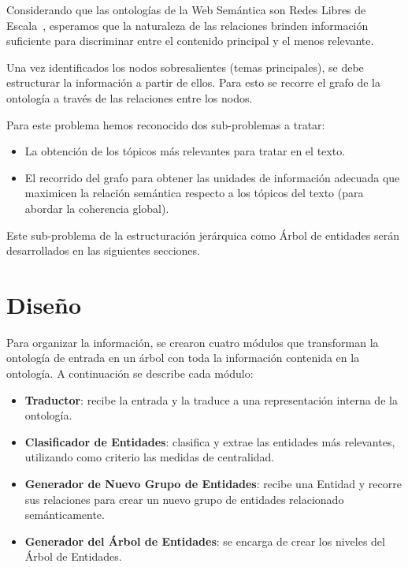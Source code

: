 Considerando que las ontologías de la Web Semántica son Redes Libres de Escala~\cite{zhang2008scale}, esperamos que la naturaleza de las relaciones brinden información suficiente para discriminar entre el contenido principal y el menos relevante. 

Una vez identificados los nodos sobresalientes (temas principales), se debe estructurar la información a partir de ellos. Para esto se recorre el grafo de la ontología a través de las relaciones entre los nodos.

Para este problema hemos reconocido dos sub-problemas a tratar:

\begin{itemize}
    \item La obtención de los tópicos más relevantes para tratar en el texto.%
    \item El recorrido del grafo para obtener las unidades de información adecuada que maximicen la relación semántica respecto a los tópicos del texto (para abordar la coherencia global).%
\end{itemize}

Este sub-problema de la estructuración jerárquica como Árbol de entidades serán desarrollados en las siguientes secciones.  %


\section{Diseño}
Para organizar la información, se crearon cuatro módulos que transforman la ontología de entrada en un árbol con toda la información contenida en la ontología. A continuación se describe cada módulo:
\begin{itemize}
    \item \textbf{Traductor}: recibe la entrada y la traduce a una representación interna de la ontología.
    \item \textbf{Clasificador de Entidades}: clasifica y extrae las entidades más relevantes, utilizando como criterio las medidas de centralidad.
    \item \textbf{Generador de Nuevo Grupo de Entidades}: recibe una Entidad y recorre sus relaciones para crear un nuevo grupo de entidades relacionado semánticamente.
    \item \textbf{Generador del Árbol de Entidades}: se encarga de crear los niveles del Árbol de Entidades. 
\end{itemize}

